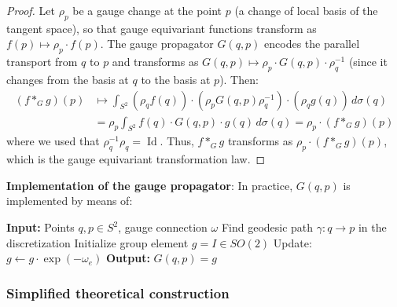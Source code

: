 \begin{proof}
Let $\rho_p$ be a gauge change at the point $p$ (a change of local basis of the tangent space), so that gauge equivariant functions transform as $f(p) \mapsto \rho_p \cdot f(p)$. The gauge propagator $G(q,p)$ encodes the parallel transport from $q$ to $p$ and transforms as $G(q,p) \mapsto \rho_p \cdot G(q,p) \cdot \rho_q^{-1}$ (since it changes from the basis at $q$ to the basis at $p$). Then:
\begin{align}
(f *_G g)(p) &\mapsto \int_{S^2} (\rho_q f(q)) \cdot (\rho_p G(q,p) \rho_q^{-1}) \cdot (\rho_q g(q)) \, d\sigma(q) \\
&= \rho_p \int_{S^2} f(q) \cdot G(q,p) \cdot g(q) \, d\sigma(q) = \rho_p \cdot (f *_G g)(p)
\end{align}
where we used that $\rho_q^{-1} \rho_q = \operatorname{Id}$. Thus, $f *_G g$ transforms as $\rho_p \cdot (f *_G g)(p)$, which is the gauge equivariant transformation law.
\end{proof}

\textbf{Implementation of the gauge propagator}: In practice, $G(q,p)$ is implemented by means of:

\begin{algorithm}[H]
\caption{Computation of the Icosahedral Gauge Propagator}
\begin{algorithmic}[1]
    \State \textbf{Input:} Points $q, p \in S^2$, gauge connection $\omega$
    \State Find geodesic path $\gamma: q \to p$ in the discretization
    \State Initialize group element $g = I \in SO(2)$
        \State Update: $g \leftarrow g \cdot \exp(-\omega_e)$
    \EndFor
    \State \textbf{Output:} $G(q,p) = g$
\end{algorithmic}
\end{algorithm}

\subsubsection{Simplified theoretical construction}

